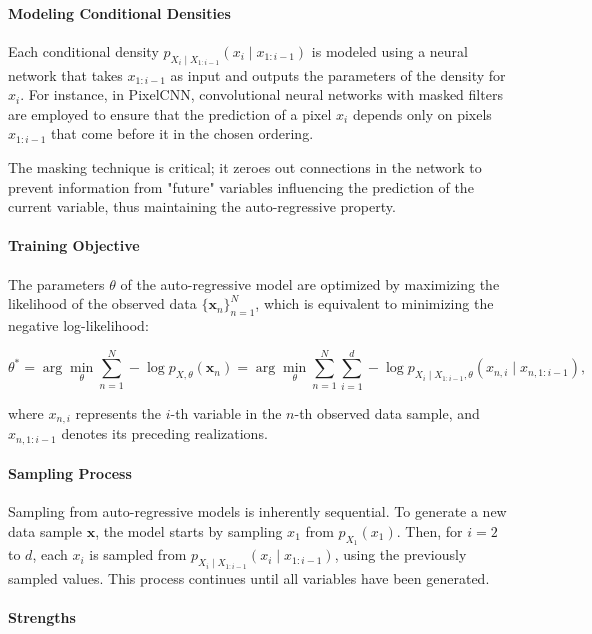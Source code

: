 \paragraph{Modeling Conditional Densities}

Each conditional density \( p_{X_i \mid X_{1:i-1}}(x_i \mid x_{1:i-1}) \) is modeled using a neural network that takes \( x_{1:i-1} \) as input and outputs the parameters of the density for \( x_i \). For instance, in PixelCNN, convolutional neural networks with masked filters are employed to ensure that the prediction of a pixel \( x_i \) depends only on pixels \( x_{1:i-1} \) that come before it in the chosen ordering.

The masking technique is critical; it zeroes out connections in the network to prevent information from "future" variables influencing the prediction of the current variable, thus maintaining the auto-regressive property.

\paragraph{Training Objective}

The parameters \( \theta \) of the auto-regressive model are optimized by maximizing the likelihood of the observed data \( \{\mathbf{x}_n\}_{n=1}^N \), which is equivalent to minimizing the negative log-likelihood:

\[
\theta^* = \arg \min_{\theta} \sum_{n=1}^{N} -\log p_{X,\theta}(\mathbf{x}_n) = \arg \min_{\theta} \sum_{n=1}^{N} \sum_{i=1}^{d} -\log p_{X_i \mid X_{1:i-1}, \theta}(x_{n,i} \mid x_{n,1:i-1}),
\]

\noindent where \( x_{n,i} \) represents the \( i \)-th variable in the \( n \)-th observed data sample, and \( x_{n,1:i-1} \) denotes its preceding realizations.

\paragraph{Sampling Process}

Sampling from auto-regressive models is inherently sequential. To generate a new data sample \( \mathbf{x} \), the model starts by sampling \( x_1 \) from \( p_{X_1}(x_1) \). Then, for \( i = 2 \) to \( d \), each \( x_i \) is sampled from \( p_{X_i \mid X_{1:i-1}}(x_i \mid x_{1:i-1}) \), using the previously sampled values. This process continues until all variables have been generated.

\paragraph{Strengths}

